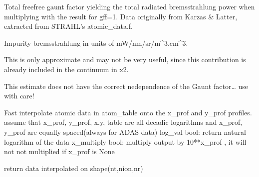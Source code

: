 \documentclass[letterpaper,10pt,english]{sphinxmanual}
\begin{document}

\begin{fulllineitems}
\label{\detokenize{aurora:aurora.atomic.gff_mean}}
Total free\sphinxhyphen{}free gaunt factor yielding the total radiated bremsstrahlung power
when multiplying with the result for gff=1.
Data originally from Karzas \& Latter, extracted from STRAHL’s atomic\_data.f.

\end{fulllineitems}


\begin{fulllineitems}
\label{\detokenize{aurora:aurora.atomic.impurity_brems}}
Impurity bremsstrahlung in units of mW/nm/sr/m\textasciicircum{}3.cm\textasciicircum{}3.

This is only approximate and may not be very useful, since this contribution
is already included in the continuum in x2.

This estimate does not have the correct ne\sphinxhyphen{}dependence of the Gaunt factor… use with care!

\end{fulllineitems}


\begin{fulllineitems}
\label{\detokenize{aurora:aurora.atomic.interp_atom_prof}}
Fast interpolate atomic data in atom\_table onto the x\_prof and y\_prof profiles.
assume that x\_prof, y\_prof, x,y, table are all decadic logarithms
and x\_prof, y\_prof are equally spaced(always for ADAS data)
log\_val bool: return natural logarithm of the data
x\_multiply bool: multiply output by 10**x\_prof , it will not not multiplied if x\_prof is None

return data interpolated on shape(nt,nion,nr)

\end{fulllineitems}
\end{document}
